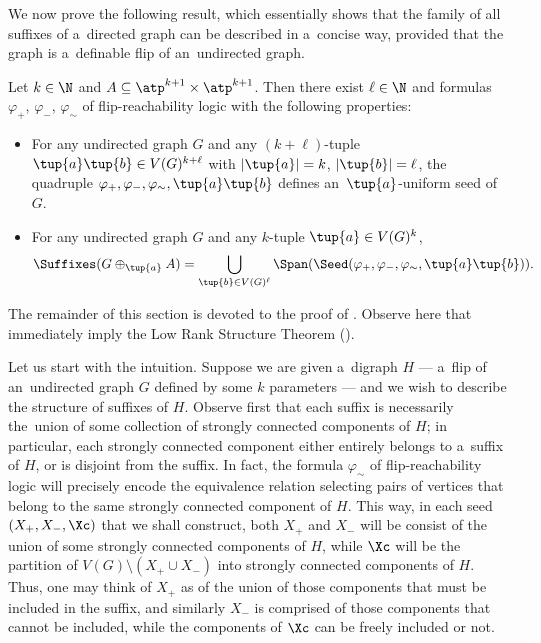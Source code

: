 We now prove the following result, which essentially shows that the family of all suffixes of a~directed graph can be described in a~concise way, provided that the graph is a~definable flip of an~undirected graph.

\begin{lemma}
    \label{lem:suffixes-to-spans}
    Let $k \in \N$ and $A \subseteq \atp^{k+1} \times \atp^{k+1}$.
    Then there exist $\ell \in \N$ and formulas $\varphi_+$, $\varphi_-$, $\varphi_\sim$ of flip-reachability logic with the following properties:
    \begin{itemize}[nosep]
        \item For any undirected graph $G$ and any $(k+\ell)$-tuple $\tup{a}\tup{b} \in V(G)^{k+\ell}$ with $|\tup{a}| = k$, $|\tup{b}| = \ell$,   the quadruple $\varphi_+, \varphi_-, \varphi_\sim, \tup{a}\tup{b}$ defines an~$\tup{a}$-uniform seed of $G$.
        \item For any undirected graph $G$ and any $k$-tuple $\tup{a} \in V(G)^k$,
        \begin{equation}
            \label{eq:suffixes-eq-span}
            \Suffixes(G \oplus_{\tup{a}} A) = \bigcup_{\tup{b} \in V(G)^\ell} \Span(\Seed(\varphi_+, \varphi_-, \varphi_{\sim}, \tup{a}\tup{b})).
        \end{equation}
    \end{itemize}
\end{lemma}

The remainder of this section is devoted to the proof of .
Observe here that  immediately imply the Low Rank Structure Theorem ().

Let us start with the intuition.
Suppose we are given a~digraph $H$ --- a~flip of an~undirected graph $G$ defined by some $k$ parameters --- and we wish to describe the structure of suffixes of $H$.
Observe first that each suffix is necessarily the~union of some collection of strongly connected components of $H$; in particular, each strongly connected component either entirely belongs to a~suffix of $H$, or is disjoint from the suffix.
In fact, the formula $\varphi_\sim$ of flip-reachability logic will precisely encode the equivalence relation selecting pairs of vertices that belong to the same strongly connected component of $H$.
This way, in each seed $(X_+, X_-, \Xc)$ that we shall construct, both $X_+$ and $X_-$ will be consist of the union of some strongly connected components of $H$, while $\Xc$ will be the partition of $V(G) \setminus (X_+ \cup X_-)$ into strongly connected components of $H$. Thus, one may think of $X_+$ as of the union of those components that must be included in the suffix, and similarly $X_-$ is comprised of those components that cannot be included, while the components of $\Xc$ can be freely included or not.

